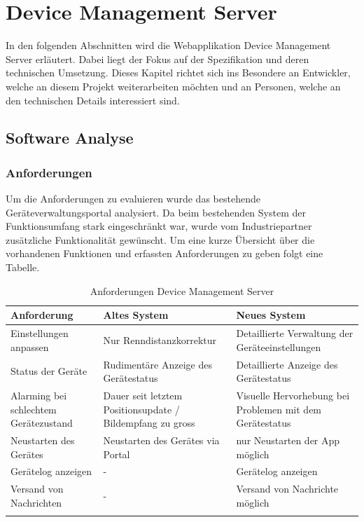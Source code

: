 \chapter{Device Management Server}

In den folgenden Abschnitten wird die Webapplikation Device Management Server erläutert. Dabei liegt der Fokus auf der Spezifikation und deren technischen Umsetzung. Dieses Kapitel richtet sich ins Besondere an Entwickler, welche an diesem Projekt weiterarbeiten möchten und an Personen, welche an den technischen Details interessiert sind.

\section{Software Analyse}

\subsection{Anforderungen}
Um die Anforderungen zu evaluieren wurde das bestehende Geräteverwaltungsportal analysiert. Da beim bestehenden System der Funktionsumfang stark eingeschränkt war, wurde vom Industriepartner zusätzliche Funktionalität gewünscht.
Um eine kurze Übersicht über die vorhandenen Funktionen und erfassten Anforderungen zu geben folgt  eine Tabelle.

{\renewcommand{\arraystretch}{2}%
    \begin{longtable}{  p{3.5cm} | p{4.3cm} | p{4.3cm} }

    \textbf{Anforderung} & \textbf{Altes System} & \textbf{Neues System} \\ \hline
\hline
    Einstellungen anpassen & Nur Renndistanzkorrektur & Detaillierte Verwaltung der Geräteeinstellungen \\ \hline
    Status der Geräte & Rudimentäre Anzeige des Gerätestatus & Detaillierte Anzeige des Gerätestatus \\
    \hline
     Alarming bei schlechtem Gerätezustand & Dauer seit letztem Positionsupdate / Bildempfang zu gross & Visuelle Hervorhebung bei Problemen mit dem Gerätestatus \\
    \hline
    Neustarten des Gerätes & Neustarten des Gerätes via Portal & nur Neustarten der App möglich\\
    \hline
    Gerätelog anzeigen & - & Gerätelog anzeigen\\
    \hline
    Versand von Nachrichten & - & Versand von Nachrichte möglich\\

\caption{Anforderungen Device Management Server}
\end{longtable}}

